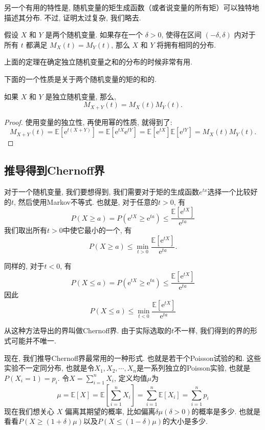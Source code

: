 另一个有用的特性是, 随机变量的矩生成函数（或者说变量的所有矩）可以独特地描述其分布. 
不过, 证明太过复杂, 我们略去. 

\begin{theorem}
假设 $X$ 和 $Y$ 是两个随机变量. 如果存在一个 $\delta > 0$, 使得在区间 $(-\delta, \delta)$ 内对于所有 $t$ 都满足
$M_X(t) = M_Y(t)$, 那么 $X$ 和 $Y$ 将拥有相同的分布. 

\end{theorem}

上面的定理在确定独立随机变量之和的分布的时候非常有用. 

下面的一个性质是关于两个随机变量的矩的和的. 
\begin{theorem}
    如果 $X$ 和 $Y$ 是独立随机变量, 那么, $$M_{X+Y}(t)=M_X(t) M_Y(t).$$
\end{theorem}

\begin{proof}
    使用变量的独立性, 再使用幂的性质, 就得到了:$$M_{X+Y}(t)=\mathbb{E}\left[\mathrm{e}^{t(X+Y)}\right]=\mathbb{E}\left[\mathrm{e}^{t X} \mathrm{e}^{t Y}\right]=\mathbb{E}\left[\mathrm{e}^{t X}\right] \mathbb{E}\left[\mathrm{e}^{t Y}\right]=M_X(t) M_Y(t).$$
\end{proof}

\subsection{推导得到Chernoff界}

对于一个随机变量, 我们要想得到, 我们需要对于矩的生成函数$e^{tx}$选择一个比较好的$t$, 然后使用Markov不等式. 也就是, 对于任意的$t>0$, 有$$P(X \geq a)=P\left(\mathrm{e}^{t X} \geq \mathrm{e}^{t a}\right) \leq \frac{\mathbb{E}\left[\mathrm{e}^{t X}\right]}{\mathrm{e}^{t a}}$$我们取出所有$t>0$中使它最小的一个, 有$$
P(X \geq a) \leq \min _{t>0} \frac{\mathbb{E}\left[\mathrm{e}^{t X}\right]}{\mathrm{e}^{t a}}.$$

同样的, 对于$t<0$, 有
$$
P(X \leq a)=P\left(\mathrm{e}^{t X} \geq \mathrm{e}^{t a}\right) \leq \frac{\mathbb{E}\left[\mathrm{e}^{t X}\right]}{\mathrm{e}^{t a}}
$$
因此
$$
P(X \leq a) \leq \min _{t<0} \frac{\mathbb{E}\left[\mathrm{e}^{t X}\right]}{\mathrm{e}^{t a}}
$$

从这种方法导出的界叫做Chernoff界. 由于实际选取的$t$不一样, 我们得到的界的形式可能并不唯一. 

现在, 我们推导Chernoff界最常用的一种形式. 也就是若干个Poisson试验的和. 这些实验不一定同分布,  也就是令$X_1, X_2, \cdots, X_n$是一系列独立的Poisson实验, 也就是$P\left(X_i=1\right)=p_i$. 令$X=\sum_{i=1}^n X_i$, 定义均值$\mu$为
$$
\mu=\mathbb{E}[X]=\mathbb{E}\left[\sum_{i=1}^n X_i\right]=\sum_{i=1}^n \mathbb{E}\left[X_i\right]=\sum_{i=1}^n p_i
$$
现在我们想关心 $X$ 偏离其期望的概率, 比如偏离$\delta \mu(\delta>0)$的概率是多少.  也就是看看$P(X \geq(1+\delta) \mu)$以及$P(X \leq(1-\delta) \mu)$的大小是多少.

